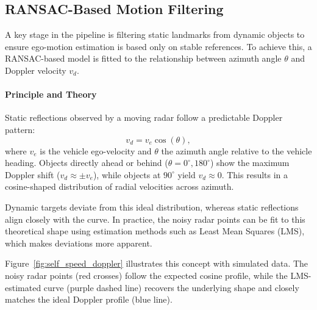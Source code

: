 \subsection{RANSAC-Based Motion Filtering}
A key stage in the pipeline is filtering static landmarks from dynamic objects to ensure ego-motion estimation is based only on stable references.  
To achieve this, a RANSAC-based model is fitted to the relationship between azimuth angle $\theta$ and Doppler velocity $v_d$.

\paragraph{Principle and Theory}
Static reflections observed by a moving radar follow a predictable Doppler pattern:
\[
v_d = v_e \cos(\theta),
\]
where $v_e$ is the vehicle ego-velocity and $\theta$ the azimuth angle relative to the vehicle heading.  
Objects directly ahead or behind ($\theta = 0^\circ, 180^\circ$) show the maximum Doppler shift ($v_d \approx \pm v_e$), while objects at $90^\circ$ yield $v_d \approx 0$.  
This results in a cosine-shaped distribution of radial velocities across azimuth.  

Dynamic targets deviate from this ideal distribution, whereas static reflections align closely with the curve.
In practice, the noisy radar points can be fit to this theoretical shape using estimation methods such as Least Mean Squares (LMS), which makes deviations more apparent.  

Figure~\ref{fig:self_speed_doppler} illustrates this concept with simulated data.  
The noisy radar points (red crosses) follow the expected cosine profile, while the LMS-estimated curve (purple dashed line) recovers the underlying shape and closely matches the ideal Doppler profile (blue line).  

